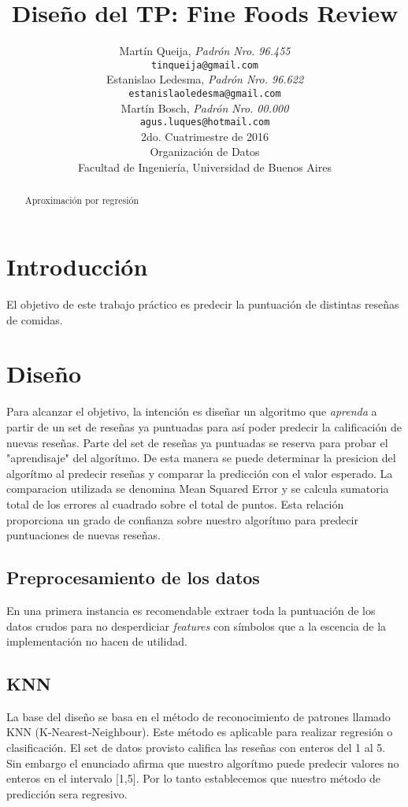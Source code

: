 \documentclass[a4paper,10pt]{article}
\title{		\textbf{Diseño del TP: Fine Foods Review}}
\author{	Martín Queija, \textit{Padrón Nro. 96.455}                     \\
	\texttt{ tinqueija@gmail.com }                                              \\[2.5ex]
	Estanislao Ledesma, \textit{Padrón Nro. 96.622}                     \\
	\texttt{ estanislaoledesma@gmail.com }                                              \\[2.5ex]
	Martín Bosch, \textit{Padrón Nro. 00.000}                     \\
	\texttt{ agus.luques@hotmail.com }                                              \\[2.5ex]
	\normalsize{2do. Cuatrimestre de 2016}                                      \\
	\normalsize{Organización de Datos  }  \\
	\normalsize{Facultad de Ingeniería, Universidad de Buenos Aires}            \\
}
\date{}
\begin{document}
	
	\maketitle
	\thispagestyle{empty}   %
	
	
	\begin{abstract}
		\centerline{Aproximación por regresión}
		
	\end{abstract}
	\newpage
	
	\tableofcontents
	
	
	\section{Introducción}
	
	El objetivo de este trabajo práctico es predecir la puntuación de distintas reseñas de comidas.
	
	\section{Diseño}
	
	Para alcanzar el objetivo, la intención es diseñar un algoritmo que \textit{aprenda} a partir de un set de reseñas ya puntuadas para así poder predecir la calificación de nuevas reseñas. Parte del set de reseñas ya puntuadas se reserva para probar el "aprendisaje" del algorítmo. De esta manera se puede determinar la presicion del algorítmo al predecir reseñas y comparar la predicción con el valor esperado. La comparacion utilizada se denomina Mean Squared Error y se calcula sumatoria total de los errores al cuadrado sobre el total de puntos. Esta relación proporciona un grado de confianza sobre nuestro algorítmo para predecir puntuaciones de nuevas reseñas.
	
	
	\subsection{Preprocesamiento de los datos}	
	En una primera instancia es recomendable extraer toda la puntuación de los datos crudos para no desperdiciar \textit{features} con símbolos que a la escencia de la implementación no hacen de utilidad.
	
	\subsection{KNN}
	La base del diseño se basa en el método de reconocimiento de patrones llamado KNN (K-Nearest-Neighbour). Este método es aplicable para realizar regresión o clasificación. El set de datos provisto califica las reseñas con enteros del 1 al 5. Sin embargo el enunciado afirma que nuestro algorítmo puede predecir valores no enteros en el intervalo [1,5]. Por lo tanto establecemos que nuestro método de predicción sera regresivo.
	
\end{document}
